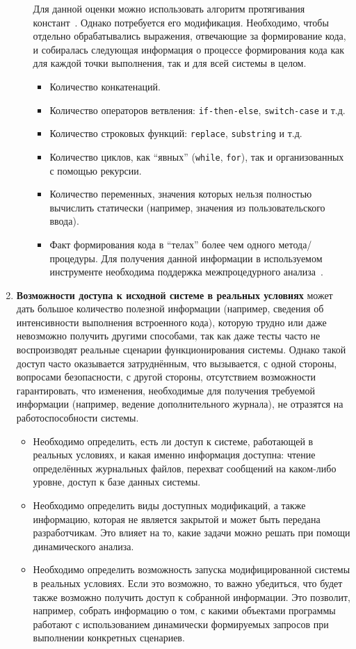 \begin{enumerate}
\begin{itemize}
    Для данной оценки можно использовать алгоритм протягивания констант~\cite{Dragon}. Однако потребуется его модификация. Необходимо, чтобы отдельно обрабатывались выражения, отвечающие за формирование кода, и собиралась следующая информация о процессе формирования кода как для каждой точки выполнения, так и для всей системы в целом.
    \begin{itemize}
      \item Количество конкатенаций.
      \item Количество операторов ветвления: \verb|if-then-else|, \verb|switсh-case| и т.д.
      \item Количество строковых функций: \verb|replace|, \verb|substring| и т.д.
      \item Количество циклов, как ``явных'' (\verb|while|, \verb|for|), так и организованных с помощью рекурсии.
      \item Количество переменных, значения которых нельзя полностью вычислить статически (например, значения из пользовательского ввода).
      \item Факт формирования кода в ``телах'' более чем одного метода/процедуры. Для получения данной информации в используемом инструменте необходима поддержка межпроцедурного анализа~\cite{interprocedural1,interprocedural1, Dragon}.
    \end{itemize}
  \end{itemize}

  \item \textbf{Возможности доступа к исходной системе в реальных условиях} может дать большое количество полезной информации (например, сведения об интенсивности выполнения встроенного кода), которую трудно или даже невозможно получить другими способами, так как даже тесты часто не воспроизводят реальные сценарии функционирования системы. Однако такой доступ часто оказывается затруднённым, что вызывается, с одной стороны, вопросами безопасности, с другой стороны, отсутствием возможности гарантировать, что изменения, необходимые для получения требуемой информации (например, ведение дополнительного журнала), не отразятся на работоспособности системы.  
  \begin{itemize}
    \item Необходимо определить, есть ли доступ к системе, работающей в реальных условиях, и какая именно информация доступна: чтение определённых журнальных файлов, перехват сообщений на каком-либо уровне, доступ к базе данных системы.
    \item Необходимо определить виды доступных модификаций, а также информацию, которая не является закрытой и может быть передана разработчикам. Это влияет на то, какие задачи можно решать при помощи динамического анализа.
    \item Необходимо определить возможность запуска модифицированной системы в реальных условиях. Если это возможно, то важно убедиться, что будет также возможно получить доступ к собранной информации. Это позволит, например, собрать информацию о том, с какими объектами программы работают с использованием динамически формируемых запросов при выполнении конкретных сценариев.
  \end{itemize}


\end{enumerate}

